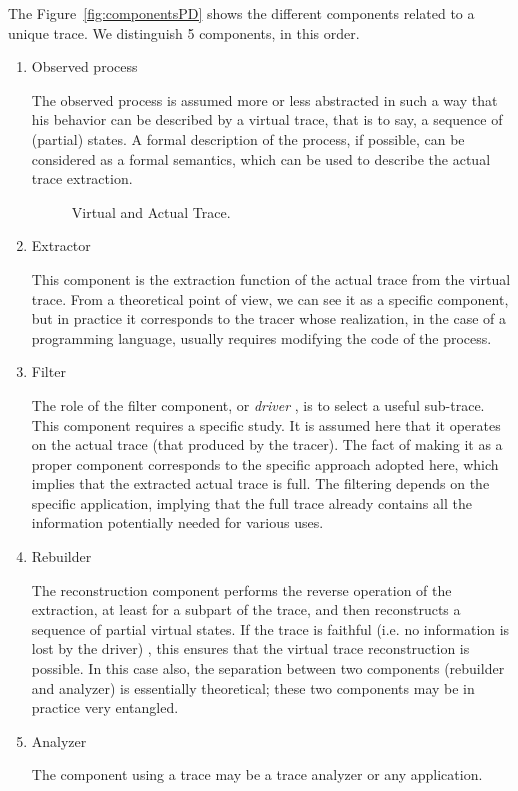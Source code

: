 The Figure~\ref{fig:componentsPD} shows the different components related to a unique trace.
We distinguish  5 components, in this order.\begin{enumerate}
\item Observed process

The observed process is assumed more or less abstracted in such a way that his behavior can be described by a virtual trace, that is to say, a sequence of (partial) states. A formal description of the process, if possible, can be considered as a formal semantics, which can be used to describe the actual trace extraction.

\begin{figure} [h]
\centering
{}
\caption[Virtual and Actual Trace]
{Virtual and Actual Trace.}
\label{fig:chromepipiline}
\end{figure} 


\item Extractor

This component is the extraction function of the actual trace from the virtual trace. From a theoretical point of view, we can see it as a specific component, but in practice it corresponds to the tracer whose realization, in the case of a programming language, usually requires modifying the code of the process.
\item Filter

The role of the filter component, or {\em driver} \cite{DLads05}, is to select a useful sub-trace. This component requires a specific study. It is assumed here that it operates on the actual trace (that produced by the tracer). The fact of making it as a proper component corresponds to the specific approach adopted here, which implies that the extracted actual trace is full. The filtering depends on the specific application, implying that the full trace already contains all the information potentially needed for various uses.
\item Rebuilder

The reconstruction component performs the reverse operation of the extraction, at least for a subpart of the trace, and then reconstructs a sequence of partial virtual states. If the trace is faithful (i.e. no information is lost by the driver) \cite{TMTmanuscript}, this ensures that the virtual trace reconstruction is possible. In this case also, the separation between two components (rebuilder and analyzer) is essentially theoretical; these two components may be in practice very entangled.
\item Analyzer

The component using a trace may be a trace analyzer or any application. 
\end{enumerate}


